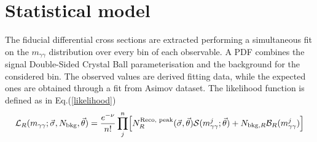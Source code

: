 \section{Statistical model}
The fiducial differential cross sections are extracted performing a simultaneous fit on the  $m_{\gamma\gamma}$ distribution over every bin of each observable. A PDF combines the signal Double-Sided Crystal Ball parameterisation and the background for the considered bin. The observed values are derived fitting data, while the expected ones are obtained through a fit from Asimov dataset. The likelihood function is defined as in Eq.(\ref{likelihood})
\begin{equation}
\mathcal{L}_R(m_{\gamma\gamma}; \vec{\sigma}, N_{\text{bkg}}, \vec{\theta}) = \frac{e^{-\nu}}{n!} \prod_{j}^{n}\Bigl[N_R^{\text{Reco, peak}}(\vec{\sigma}, \vec{\theta}) \mathcal{S}(m_{\gamma\gamma}^j; \vec{\theta}) + N_{\text{bkg}, R} \mathcal{B}_R(m_{\gamma\gamma}^j)\Bigr]
\label{likelihood}
\end{equation} 
